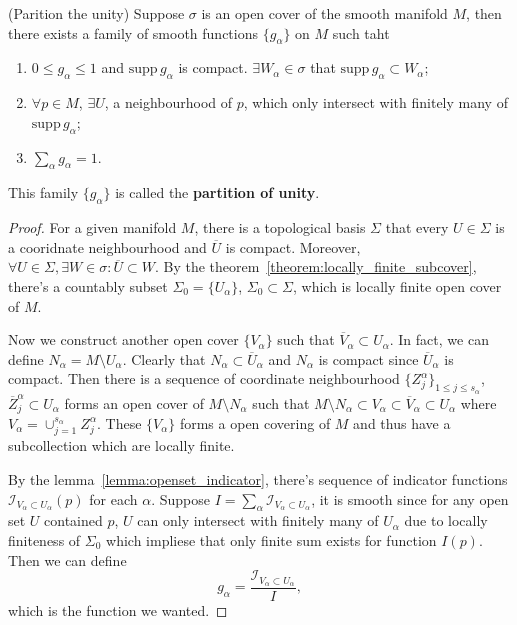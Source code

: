\begin{theorem}(Parition the unity)
Suppose $\sigma$ is an open cover of the smooth manifold $M$, then there exists a family of smooth functions $\{g_\alpha\}$ on $M$ such taht
\begin{enumerate}
\item $0\le g_\alpha\le1$ and $\text{supp}\,g_\alpha$ is compact. $\exists W_\alpha\in\sigma$ that $\text{supp}\,g_\alpha\subset W_\alpha$;
\item $\forall p\in M$, $\exists U$, a neighbourhood of $p$, which only intersect with finitely many of $\text{supp}\,g_\alpha$;
\item $\sum_\alpha g_\alpha=1$.
\end{enumerate}
This family $\{g_\alpha\}$ is called the \textbf{partition of unity}.
\end{theorem}\label{theorem:parition_the_unity}

\begin{proof}
For a given manifold $M$, there is a topological basis $\Sigma$ that every $U\in\Sigma$ is a cooridnate neighbourhood and $\overline{U}$ is compact. Moreover, $\forall U\in\Sigma,\exists W\in\sigma:\overline{U}\subset W$. By the theorem~\ref{theorem:locally_finite_subcover}, there's a countably subset $\Sigma_0=\{U_\alpha\}$, $\Sigma_0\subset\Sigma$, which is locally finite open cover of $M$. 

Now we construct another open cover $\{V_\alpha\}$ such that $\overline{V}_\alpha\subset U_\alpha$. In fact, we can define $N_\alpha=M\setminus U_\alpha$. Clearly that $N_\alpha\subset\overline{U}_\alpha$ and $N_\alpha$ is compact since $\overline{U}_\alpha$ is compact. Then there is a sequence of coordinate neighbourhood $\{Z_j^\alpha\}_{1\le j\le s_\alpha}$, $\overline{Z}_j^\alpha\subset U_\alpha$ forms an open cover of $M\setminus N_\alpha$ such that $M\setminus N_\alpha\subset V_\alpha\subset\overline{V}_\alpha\subset U_\alpha$ where $V_\alpha=\cup_{j=1}^{s_\alpha}Z_j^\alpha$. These $\{V_\alpha\}$ forms a open covering of $M$ and thus have a subcollection which are locally finite. 

By the lemma~\ref{lemma:openset_indicator}, there's sequence of indicator functions $\mathcal{I}_{V_\alpha\subset U_\alpha}(p)$ for each $\alpha$. Suppose $I=\sum_\alpha\mathcal{I}_{V_\alpha\subset U_\alpha}$, it is smooth since for any open set $U$ contained $p$, $U$ can only intersect with finitely many of $U_\alpha$ due to locally finiteness of $\Sigma_0$ which impliese that only finite sum exists for function $I(p)$. Then we can define 
\begin{equation}
g_\alpha=\frac{\mathcal{I}_{V_\alpha\subset U_\alpha}}{I},
\end{equation}
which is the function we wanted.
\end{proof}


